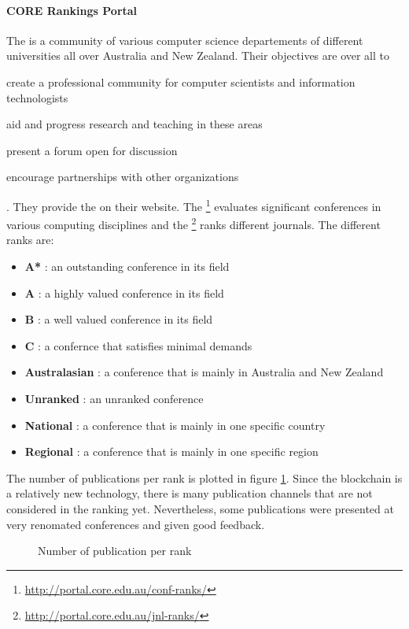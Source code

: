 \clearpage
\paragraph{CORE Rankings Portal }The  is a community of various computer science departements of different universities all over Australia and New Zealand. Their objectives are over all to 
\begin{enumerate*}[label={\Alph*)},font={\color{red!50!black}\bfseries}]
	\item create a professional community for computer scientists and information technologists
	\item aid and progress research and teaching in these areas
	\item present a forum open for discussion 
	\item encourage partnerships with other organizations
\end{enumerate*}. 
They provide the  on their website. 
The \footnote{\url{http://portal.core.edu.au/conf-ranks/}} evaluates significant conferences in various computing disciplines and the \footnote{\url{http://portal.core.edu.au/jnl-ranks/}} ranks different journals. The different ranks are:
\begin{itemize}[noitemsep]
	\item \textbf{A*} : an outstanding conference in its field
	\item \textbf{A} : a highly valued conference in its field
	\item \textbf{B} : a well valued conference in its field
	\item \textbf{C} : a confernce that satisfies minimal demands
	\item \textbf{Australasian} : a conference that is mainly in Australia and New Zealand
	\item \textbf{Unranked} : an unranked conference
	\item \textbf{National} : a conference that is mainly in one specific country
	\item \textbf{Regional} : a conference that is mainly in one specific region
\end{itemize}
The number of publications per rank is plotted in figure \ref{fig:rq3_publication_channel_ranking}. Since the blockchain is a relatively new technology, there is many publication channels that are not considered in the ranking yet. Nevertheless, some publications were presented at very renomated conferences and given good feedback.
\begin{figure}[!ht]
	\centering
	\caption{Number of publication per rank} 
	\label{fig:rq3_publication_channel_ranking}
\end{figure}

